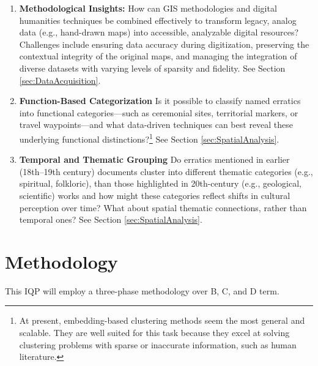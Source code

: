 \documentclass{article}
\begin{document}
\begin{enumerate}
    \item \textbf{Methodological Insights:} How can GIS methodologies and digital humanities techniques be combined effectively to transform legacy, analog data (e.g., hand-drawn maps) into accessible, analyzable digital resources? Challenges include ensuring data accuracy during digitization, preserving the contextual integrity of the original maps, and managing the integration of diverse datasets with varying levels of sparsity and fidelity. See Section \ref{sec:DataAcquisition}.

    \item \textbf{Function-Based Categorization}
    Is it possible to classify named erratics into functional categories—such as ceremonial sites, territorial markers, or travel waypoints---and what data-driven techniques can best reveal these underlying functional distinctions?\footnote{At present, embedding-based clustering methods seem the most general and scalable. They are well suited for this task because they excel at solving clustering problems with sparse or inaccurate information, such as human literature.} See Section \ref{sec:SpatialAnalysis}.

    \item \textbf{Temporal and Thematic Grouping}
    Do erratics mentioned in earlier (18th–19th century) documents cluster into different thematic categories (e.g., spiritual, folkloric), than those highlighted in 20th-century (e.g., geological, scientific) works and how might these categories reflect shifts in cultural perception over time? What about spatial thematic connections, rather than temporal ones? See Section \ref{sec:SpatialAnalysis}.
\end{enumerate}

\section{Methodology}
This IQP will employ a three-phase methodology over B, C, and D term.
\end{document}

